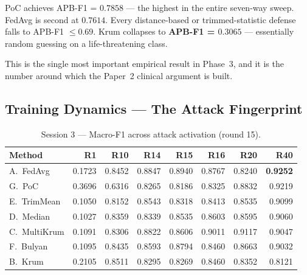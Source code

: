 \documentclass[11pt,a4paper]{article}
\begin{document}
\begin{successbox}
PoC achieves APB-F1 = $0.7858$ --- the highest in the entire seven-way
sweep. FedAvg is second at $0.7614$. Every distance-based or
trimmed-statistic defense falls to APB-F1 $\leq 0.69$. Krum collapses to
\textbf{APB-F1 = $0.3065$} --- essentially random guessing on a
life-threatening class.

This is the single most important empirical result in Phase~3, and it is
the number around which the Paper~2 clinical argument is built.
\end{successbox}

\subsection{Training Dynamics --- The Attack Fingerprint}

\begin{table}[H]
\centering
\caption{Session 3 --- Macro-F1 across attack activation (round 15).}
\label{tab:s3_curve}
\begin{tabular}{@{}l rrrrrr r@{}}
\toprule
\textbf{Method} & \textbf{R1} & \textbf{R10} & \textbf{R14} & \textbf{R15} & \textbf{R16} & \textbf{R20} & \textbf{R40} \\
\midrule
A.\ FedAvg    & 0.1723 & 0.8452 & 0.8847 & 0.8940 & 0.8767 & 0.8240 & \textbf{0.9252} \\
G.\ PoC       & 0.3696 & 0.6316 & 0.8265 & 0.8186 & 0.8325 & 0.8832 & 0.9219 \\
E.\ TrimMean  & 0.1050 & 0.8152 & 0.8543 & 0.8318 & 0.8413 & 0.8535 & 0.9099 \\
D.\ Median    & 0.1027 & 0.8359 & 0.8339 & 0.8535 & 0.8603 & 0.8595 & 0.9060 \\
C.\ MultiKrum & 0.1091 & 0.8306 & 0.8822 & 0.8606 & 0.9011 & 0.9117 & 0.9047 \\
F.\ Bulyan    & 0.1095 & 0.8435 & 0.8593 & 0.8794 & 0.8460 & 0.8663 & 0.9032 \\
\rowcolor{softred}
B.\ Krum      & 0.2105 & 0.8511 & 0.8295 & 0.8269 & 0.8460 & 0.8352 & 0.8121 \\
\bottomrule
\end{tabular}
\end{table}
\end{document}
